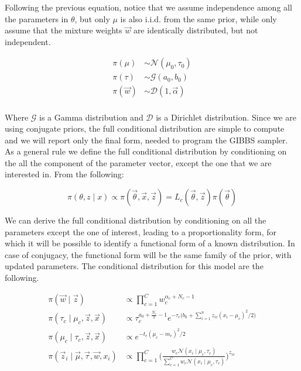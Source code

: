 \documentclass{article}
\begin{document}
Following the previous equation, notice that we assume independence among all the parameters in $\theta$, but only $\mu$ is also i.i.d. from the same prior, while only assume that the mixture weights $\vec w$ are identically distributed, but not independent. 

\begin{align*} 
\pi(\mu) & \sim \mathcal{N}(\mu_0, \tau_0) \\
\pi(\tau) &\sim \mathcal{G}(a_0,b_0) \\
\pi(\vec w) & \sim \mathcal{D}(1, \vec \alpha)\\
\end{align*}

Where $\mathcal{G}$ is a Gamma distribution and $\mathcal{D}$ is a Dirichlet distribution. Since we are using conjugate priors, the full conditional distribution are simple to compute and we will report only the final form, needed to program the GIBBS sampler. As a general rule we define the full conditional distribution by conditioning on the all the component of the parameter vector, except the one that we are interested in. From the following:

\begin{equation}
\pi(\theta, z \mid  x) \propto \pi(\vec \theta, \vec x, \vec z) = L_c(\vec \theta, \vec z) \pi(\vec \theta)
\end{equation}

We can derive the full conditional distribution by conditioning on all the parameters except the one of interest, leading to a proportionality form, for which it will be possible to identify a functional form of a known distribution. In case of conjugacy, the functional form will be the same family of the prior, with updated parameters. The conditional distribution for this model are the following.

\begin{align*}
\pi(\vec w \mid \vec z) & \propto \prod_{c=1}^C w_c^{\alpha_c + N_c -1}  \\
\pi(\tau_c \mid \mu_c, \vec z, \vec x) & \propto \tau_c^{a_0 + \frac{N_c}{2} - 1} e^{-\tau_c \big( b_0 + \sum_{i=1}^n z_{ic} (x_i - \mu_c)^2/2 \big )} \\
\pi(\mu_c \mid \tau_c, \vec z, \vec x )  & \propto e^{-t_c (\mu_c - m_c)^2/2}\\
\pi(\vec z_i \mid \vec \mu, \vec \tau, \vec w, x_i) & \propto \prod_{c=1}^C \bigg (\frac{w_c \mathcal{N}(x_i \mid \mu_c, \tau_c)}{\sum_{c=1}^C w_c \mathcal{N}(x_i \mid \mu_c, \tau_c)}\bigg)^{z_{ic}}
\end{align*}
\end{document}
